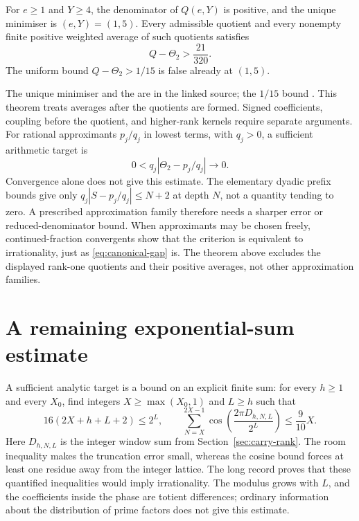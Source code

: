 \documentclass[11pt]{article}
\begin{document}
\begin{theorem}\label{res:rankonefloor}
For $e\ge1$ and $Y\ge4$, the denominator of $Q(e,Y)$ is positive, and the
unique minimiser is $(e,Y)=(1,5)$. Every admissible quotient and every
nonempty finite positive weighted average of such quotients satisfies
\[
 Q-\Theta_2>\frac{21}{320}.
\]
The uniform bound $Q-\Theta_2>1/15$ is false already at $(1,5)$.
\end{theorem}
The unique minimiser and the
are in the linked source; the $1/15$ bound
.
This theorem treats averages after the quotients are formed. Signed
coefficients, coupling before the quotient, and higher-rank kernels require
separate arguments. For rational approximants $p_j/q_j$ in lowest terms, with $q_j>0$, a sufficient arithmetic target is
\[
 0<q_j\left|\Theta_2-p_j/q_j\right|\longrightarrow0.
\]
Convergence alone does not give this estimate. The elementary dyadic
prefix bounds give only $q_j|S-p_j/q_j|\le N+2$ at depth $N$, not a
quantity tending to zero. A prescribed approximation family therefore
needs a sharper error or reduced-denominator bound. When approximants
may be chosen freely, continued-fraction convergents show that the
criterion is equivalent to irrationality, just as
\eqref{eq:canonical-gap} is. The theorem above excludes the displayed
rank-one quotients and their positive averages, not other approximation
families.

\section{A remaining exponential-sum estimate}\label{sec:open}
A sufficient analytic target is a bound on an explicit finite sum:
for every $h\ge1$ and every $X_0$, find integers $X\ge\max(X_0,1)$ and
$L\ge h$ such that
\[
 16(2X+h+L+2)\le2^L,\qquad
 \sum_{N=X}^{2X-1}\cos\!\left(\frac{2\pi D_{h,N,L}}{2^L}\right)
                                      \le\frac9{10}X.
\]
Here $D_{h,N,L}$ is the integer window sum from Section~\ref{sec:carry-rank}.
The room inequality makes the truncation error small, whereas the
cosine bound forces at least one residue away from the integer lattice.
The long record proves that these quantified inequalities would imply
irrationality. The modulus grows with $L$, and the coefficients inside
the phase are totient differences; ordinary information about the
distribution of prime factors does not give this estimate.
\end{document}

